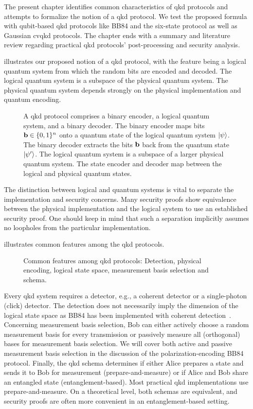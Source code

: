 The present chapter identifies common characteristics of \gls{qkd} protocols and attempts to formalize the notion of a \gls{qkd} protocol.
We test the proposed formula with qubit-based \gls{qkd} protocols like BB84 and the six-state protocol as well as Gaussian \gls{cvqkd} protocols.
The chapter ends with a summary and literature review regarding practical \gls{qkd} protocols' post-processing and security analysis.

 illustrates our proposed notion of a \gls{qkd} protocol, with the feature being a logical quantum system from which the random bits are encoded and decoded.
The logical quantum system is a subspace of the physical quantum system.
The physical quantum system depends strongly on the physical implementation and quantum encoding.
\begin{figure}[htb]
	\centering
	
	\caption{A \gls{qkd} protocol comprises a binary encoder, a logical quantum system, and a binary decoder. The binary encoder maps bits $\vb{b}\in\{0,1\}^n$ onto a quantum state of the logical quantum system $\ket{\psi}$. The binary decoder extracts the bits $\vb{b}$ back from the quantum state $\ket{\psi^\prime}$. The logical quantum system is a subspace of a larger physical quantum system. The state encoder and decoder map between the logical and physical quantum states.}\label{fig:qkd_protocol}
\end{figure}
The distinction between logical and quantum systems is vital to separate the implementation and security concerns.
Many security proofs show equivalence between the physical implementation and the logical system to use an established security proof.
One should keep in mind that such a separation implicitly assumes no loopholes from the particular implementation.

 illustrates common features among the \gls{qkd} protocols.
\begin{figure}[htb]
	\centering
	
	\caption{Common features among \gls{qkd} protocols: Detection, physical encoding, logical state space, measurement basis selection and schema.}\label{fig:qkd_classification}
\end{figure}
Every \gls{qkd} system requires a detector, e.g., a coherent detector or a single-photon (click) detector.
The detection does not necessarily imply the dimension of the logical state space as BB84 has been implemented with coherent detection~\cite{Qi2021}.
Concerning measurement basis selection, Bob can either actively choose a random measurement basis for every transmission or passively measure all (orthogonal) bases for measurement basis selection.
We will cover both active and passive measurement basis selection in the discussion of the polarization-encoding BB84 protocol.
Finally, the \gls{qkd} schema determines if either Alice prepares a state and sends it to Bob for measurement (prepare-and-measure) or if Alice and Bob share an entangled state (entanglement-based).
Most practical \gls{qkd} implementations use prepare-and-measure.
On a theoretical level, both schemas are equivalent, and security proofs are often more convenient in an entanglement-based setting.